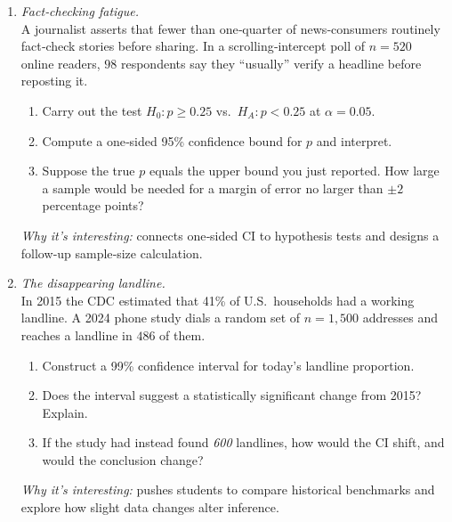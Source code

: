 \documentclass[11pt]{article}
\begin{document}
\begin{enumerate}[label=\textbf{Q\,\arabic*:}, start=6, left=0pt]

\item  \emph{Fact‑checking fatigue.}  \\
      A journalist asserts that fewer than one‑quarter of news‑consumers routinely fact‑check stories before sharing.
      In a scrolling‑intercept poll of $n=520$ online readers, $98$ respondents say they “usually” verify a headline before reposting it.
      \begin{enumerate}[label=(\alph*)]
          \item Carry out the test $H_0{:}p \ge 0.25$ vs.\ $H_A{:}p < 0.25$ at $\alpha=0.05$.
          \item Compute a one‑sided 95\% confidence bound for $p$ and interpret.
          \item Suppose the true $p$ equals the upper bound you just reported.  How large a sample would be needed for a margin of error no larger than $\pm 2$ percentage points?
      \end{enumerate}
      \textit{Why it’s interesting:} connects one‑sided CI to hypothesis tests and designs a follow‑up sample‑size calculation.

\item  \emph{The disappearing landline.}  \\
      In 2015 the CDC estimated that 41\% of U.S.\ households had a working landline.
      A 2024 phone study dials a random set of $n=1{,}500$ addresses and reaches a landline in $486$ of them.
      \begin{enumerate}[label=(\alph*)]
          \item Construct a 99\% confidence interval for today’s landline proportion.
          \item Does the interval suggest a statistically significant change from 2015?  Explain.
          \item If the study had instead found \emph{600} landlines, how would the CI shift, and would the conclusion change?
      \end{enumerate}
      \textit{Why it’s interesting:} pushes students to compare historical benchmarks and explore how slight data changes alter inference.


\end{enumerate}
\end{document}
